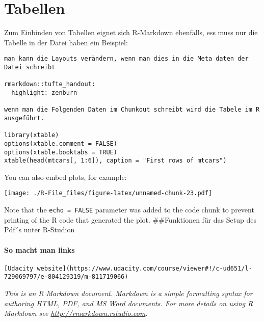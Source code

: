 \documentclass[]{article}
\begin{document}
\section{Tabellen}\label{tabellen}

Zum Einbinden von Tabellen eignet sich R-Markdown ebenfalls, ess muss
nur die Tabelle in der Datei haben ein Beispiel:

\begin{verbatim}
man kann die Layouts verändern, wenn man dies in die Meta daten der Datei schreibt

rmarkdown::tufte_handout:
  highlight: zenburn
  
wenn man die Folgenden Daten im Chunkout schreibt wird die Tabele im R ausgeführt.

library(xtable)
options(xtable.comment = FALSE)
options(xtable.booktabs = TRUE)
xtable(head(mtcars[, 1:6]), caption = "First rows of mtcars")
\end{verbatim}

You can also embed plots, for example:

\texttt{[image: ./R-File\_files/figure-latex/unnamed-chunk-23.pdf]}

Note that the \texttt{echo = FALSE} parameter was added to the code
chunk to prevent printing of the R code that generated the plot.
\#\#Funktionen für das Setup des Pdf´s unter R-Studion

\paragraph{So macht man links}\label{so-macht-man-links}

\begin{verbatim}
[Udacity website](https://www.udacity.com/course/viewer#!/c-ud651/l-729069797/e-804129319/m-811719066)
\end{verbatim}

\emph{This is an R Markdown document. Markdown is a simple formatting
syntax for authoring HTML, PDF, and MS Word documents. For more details
on using R Markdown see \url{http://rmarkdown.rstudio.com}.}
\end{document}
